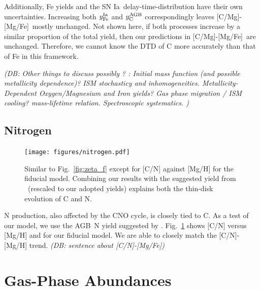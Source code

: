 \documentclass[fleqn,
usenatbib]{mnras}
\newcommand{\JJ}{\citetalias{james+21}}
\newcommand{\agb}{AGB}
\newcommand{\ia}{SN Ia}
\newcommand{\caafe}{[C/Mg]-[Mg/Fe]}
\newcommand{\Ycagb}{{y_{\rm C}^{\rm AGB}}}
\newcommand{\dbnote}[1]{ {\color{Thistle} \textit{\small (DB: #1)}} }
\begin{document}
Additionally, Fe yields and the \ia\  delay-time-distribution have their own uncertainties. Increasing both $y_{\rm Fe}^{\rm Ia}$ and $\Ycagb$ correspondingly leaves \caafe\ mostly unchanged. Not shown here, if both processes increase by a similar proportion of the total yield, then our predictions in \caafe\ are unchanged. Therefore, we cannot know the DTD of C more accurately than that of Fe in this framework.

\dbnote{Other things to discuss possibly ? :
 Initial mass function (and possible metallicity dependence)? ISM stochasticy and inhomogeneities. Metallicity-Dependent Oxygen/Magnesium and Iron yields? Gas phase migration / ISM cooling?  mass-lifetime relation. Spectroscopic systematics.
 }


\subsection{Nitrogen}


\begin{figure}
\centering
\texttt{[image: figures/nitrogen.pdf]}

\caption[]{Similar to Fig.~\ref{fig:zeta_f} except for [C/N] against [Mg/H] for the fiducial model. Combining our results with the suggested yield from \JJ\ (rescaled to our adopted yields) explains both the thin-disk evolution of C and N. 
}
\label{fig:nitrogen}
\end{figure}

N production, also affected by the CNO cycle, is closely tied to C. As a test of our model, we use the \agb\ N yield suggested by \citet{james+23}. Fig.~\ref{fig:nitrogen} shows [C/N] versus [Mg/H] and for our fiducial model. We are able to closely match the [C/N]-[Mg/H] trend. 
\dbnote{sentence about [C/N]-[Mg/Fe]}



\section{Gas-Phase Abundances}\label{sec:gas}
\end{document}
